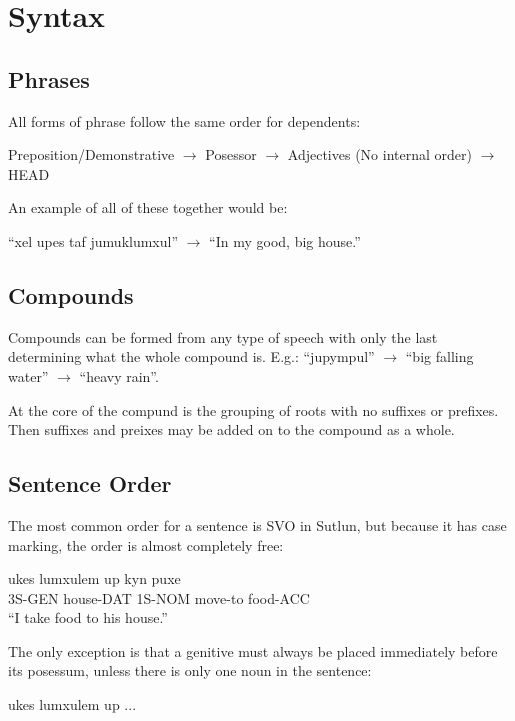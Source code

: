 \documentclass{book}
\begin{document}
\chapter{Syntax}
\section{Phrases}
All forms of phrase follow the same order for dependents:

\begin{center}
    Preposition/Demonstrative $\rightarrow$ Posessor $\rightarrow$ Adjectives (No internal order) $\rightarrow$ HEAD
\end{center}

An example of all of these together would be:

\begin{center}
    ``xel upes taf jumuklumxul'' $\rightarrow$ ``In my good, big house.''
\end{center}

\section{Compounds}
Compounds can be formed from any type of speech with only the last determining what
the whole compound is. E.g.: ``jupympul'' $\rightarrow$ ``big falling water'' $\rightarrow$ ``heavy rain''.

At the core of the compund is the grouping of roots with no suffixes or prefixes. Then suffixes and
preixes may be added on to the compound as a whole.


\section{Sentence Order}
The most common order for a sentence is SVO in Sutlun, but because it has case marking, the
order is almost completely free:

\begin{exe}
    \ex
    \gll ukes lumxulem up kyn puxe \\
    3S-GEN house-DAT 1S-NOM move-to food-ACC \\
    \glt ``I take food to his house.''
\end{exe}

The only exception is that a genitive must always be placed immediately before its posessum, unless there
is only one noun in the sentence:

\begin{center}
    \begin{exe}
        \ex ukes lumxulem up ...
    \end{exe}
\end{center}
\end{document}

